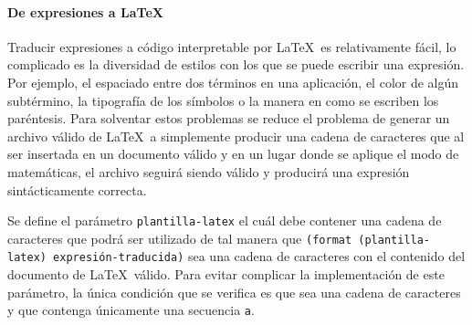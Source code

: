 \eatline
{}\nwendcode{}\nwdocspar

\nwenddocs{}\paragraph{De expresiones a \LaTeX} Traducir expresiones a código interpretable por \LaTeX~es relativamente fácil, lo complicado es la diversidad de estilos con los que se puede escribir una expresión. Por ejemplo, el espaciado entre dos términos en una aplicación, el color de algún subtérmino, la tipografía de los símbolos o la manera en como se escriben los paréntesis. Para solventar estos problemas se reduce el problema de generar un archivo válido de \LaTeX~a simplemente producir una cadena de caracteres que al ser insertada en un documento válido y en un lugar donde se aplique el modo de matemáticas, el archivo seguirá siendo válido y producirá una expresión sintácticamente correcta.

Se define el parámetro {\tt{}\protect{}plantilla-latex} el cuál debe contener una cadena de caracteres que podrá ser utilizado de tal manera que {\tt{}(format\ (\protect{}plantilla-latex)\ expresión-traducida)} sea una cadena de caracteres con el contenido del documento de \LaTeX~válido. Para evitar complicar la implementación de este parámetro, la única condición que se verifica es que sea una cadena de caracteres y que contenga únicamente una secuencia {\tt{}{}a}.


